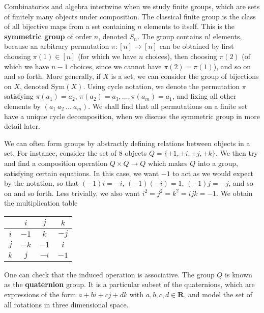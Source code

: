 \begin{example}
    Combinatorics and algebra intertwine when we study finite groups, which are sets of finitely many objects under composition. The classical finite group is the class of all bijective maps from a set containing $n$ elements to itself. This is the {\bf symmetric group} of order $n$, denoted $S_n$. The group contains $n!$ elements, because an arbitrary permutation $\pi: [n] \to [n]$ can be obtained by first choosing $\pi(1) \in [n]$ (for which we have $n$ choices), then choosing $\pi(2)$ (of which we have $n-1$ choices, since we cannot have $\pi(2) = \pi(1)$), and so on and so forth. More generally, if $X$ is a set, we can consider the group of bijections on $X$, denoted $\text{Sym}(X)$. Using cycle notation, we denote the permutation $\pi$ satisfying $\pi(a_1) = a_2$, $\pi(a_2) = a_3, \dots, \pi(a_m) = a_1$, and fixing all other elements by $(a_1\ a_2\ \dots\ a_m)$. We shall find that all permutations on a finite set have a unique cycle decomposition, when we discuss the symmetric group in more detail later.
\end{example}

\begin{example}
    We can often form groups by abstractly defining relations between objects in a set. For instance, consider the set of 8 objects $Q = \{ \pm 1, \pm i, \pm j, \pm k \}$. We then try and find a composition operation $Q \times Q \to Q$ which makes $Q$ into a group, satisfying certain equations. In this case, we want $-1$ to act as we would expect by the notation, so that $(-1)i = -i$, $(-1)(-i) = 1$, $(-1)j = -j$, and so on and so forth. Less trivially, we also want $i^2 = j^2 = k^2 = ijk = -1$. We obtain the multiplication table
    \begin{center}
    \begin{tabular}{| c | c c c}
        & $i$ & $j$ & $k$ \\ \hline $i$ & $-1$ & $k$ & $-j$ \\ $j$ & $-k$ & $-1$ & $i$ \\ $k$ & $j$ & $-i$ & $-1$
    \end{tabular}
    \end{center}
    One can check that the induced operation is associative. The group $Q$ is known as the {\bf quaternion} group. It is a particular subset of the quaternions, which are expressions of the form $a + bi + cj + dk$ with $a,b,c,d \in \mathbf{R}$, and model the set of all rotations in three dimensional space.
\end{example}


